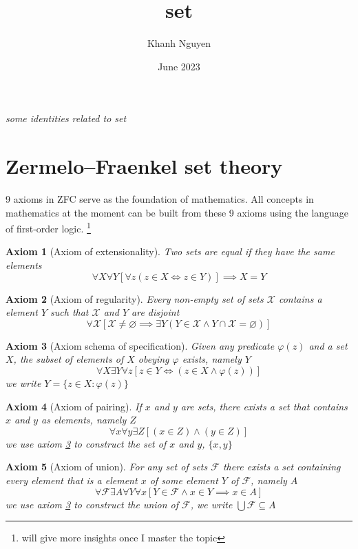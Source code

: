 \documentclass{article}
\title{set}
\author{Khanh Nguyen}
\date{June 2023}
\newtheorem{axiom}{Axiom}
\let\emptyset\varnothing
\begin{document}
\maketitle

\emph{some identities related to set}

\section{Zermelo–Fraenkel set theory}

9 axioms in ZFC serve as the foundation of mathematics. All concepts in mathematics at the moment can be built from these 9 axioms using the language of first-order logic. \footnote{will give more insights once I master the topic}

\begin{axiom}[Axiom of extensionality]
    Two sets are equal if they have the same elements
    $$
        \forall X \forall Y [\forall z (z \in X \iff z \in Y)] \implies X = Y
    $$
\end{axiom}

\begin{axiom}[Axiom of regularity]
    Every non-empty set of sets $\mathcal{X}$ contains a element $Y$ such that $\mathcal{X}$ and $Y$ are disjoint
    $$
        \forall \mathcal{X} [\mathcal{X} \neq \emptyset \implies \exists Y (Y \in \mathcal{X} \land Y \cap \mathcal{X} = \emptyset)]
    $$
\end{axiom}

\begin{axiom}[Axiom schema of specification]
    \label{axiom_schema}
    Given any predicate $\varphi(z)$ and a set $X$, the subset of elements of $X$ obeying $\varphi$ exists, namely $Y$
    $$
        \forall X \exists Y \forall z [z \in Y \iff (z \in X \land \varphi(z))]
    $$
    we write $Y = \{z \in X: \varphi(z)\}$
\end{axiom}

\begin{axiom}[Axiom of pairing]
    If $x$ and $y$ are sets, there exists a set that contains $x$ and $y$ as elements, namely $Z$
    $$
        \forall x \forall y \exists Z [(x \in Z) \land (y \in Z)]
    $$
    we use axiom \ref{axiom_schema} to construct the set of $x$ and $y$, $\{x, y\}$
\end{axiom}



\begin{axiom}[Axiom of union]
    For any set of sets $\mathcal{F}$ there exists a set containing every element that is a element $x$ of some element $Y$ of $\mathcal{F}$, namely $A$
    $$
        \forall \mathcal{F} \exists A \forall Y \forall x [Y \in \mathcal{F} \land x \in Y \implies x \in A]
    $$
    we use axiom \ref{axiom_schema} to construct the union of $\mathcal{F}$, we write $\bigcup \mathcal{F} \subseteq A$
\end{axiom}
\end{document}
